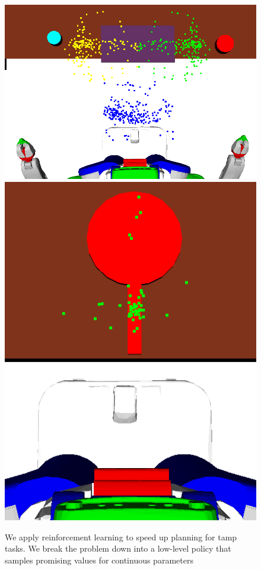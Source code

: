 \begin{figure}[t]
    \includegraphics[scale=0.13]{images/dinner_tray_final.png}
    \includegraphics[scale=0.13]{images/frying_final.png}
  \caption{\small{We apply reinforcement learning to speed up planning
      for {\sc tamp} tasks. We break the problem down into a low-level
      policy that samples promising values for continuous parameters
}}
\end{figure}
